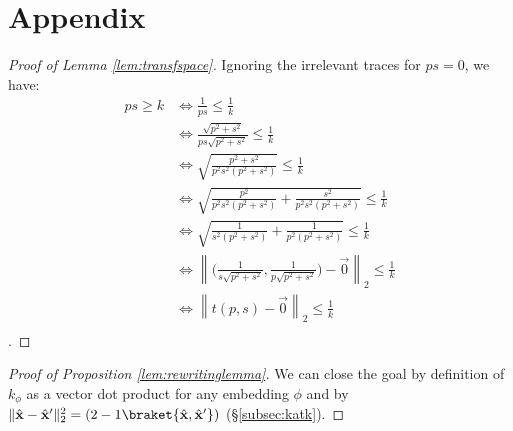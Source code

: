 \appendix
\section{Appendix}

\makeatletter
{}
\makeatother

\begin{proof}[Proof of Lemma \ref{lem:transfspace}]
Ignoring the irrelevant traces for $ps= 0$, we have:
\[\begin{aligned}
ps\geq k&{\Leftrightarrow \frac{1}{ps}\leq\frac{1}{k}} \\
&{\Leftrightarrow \frac{\sqrt{p^2+s^2}}{ps\sqrt{p^2+s^2}}\leq\frac{1}{k} }\\
&{\Leftrightarrow \sqrt{\frac{p^2+s^2}{p^2s^2(p^2+s^2)}}\leq\frac{1}{k}} \\
&{\Leftrightarrow \sqrt{\frac{p^2}{p^2s^2(p^2+s^2)}+\frac{s^2}{p^2s^2(p^2+s^2)}}\leq\frac{1}{k}} \\
&{\Leftrightarrow \sqrt{\frac{1}{s^2(p^2+s^2)}+\frac{1}{p^2(p^2+s^2)}}\leq\frac{1}{k}} \\
&{\Leftrightarrow \left\|{\biggr({\frac{1}{s\sqrt{p^2+s^2}},\frac{1}{p\sqrt{p^2+s^2}}\biggr)}-\vec{0}}\right\|_2\leq\frac{1}{k}} \\
&{\Leftrightarrow \left\|t(p,s)-\vec{0}\right\|_2\leq\frac{1}{k}} \\
\end{aligned}\]
.
\end{proof}


\begin{proof}[Proof of Proposition \ref{lem:rewritinglemma}] We can close the goal by definition of $k_{\phi}$ as a vector dot product for any embedding $\phi$ and by  $\|\hat{\mathbf{x}}-\hat{\mathbf{x}}'\|_2^2=(2-1\braket{\hat{\mathbf{x}},\hat{\mathbf{x}}'})$ (\S\ref{subsec:katk}).
\end{proof}



